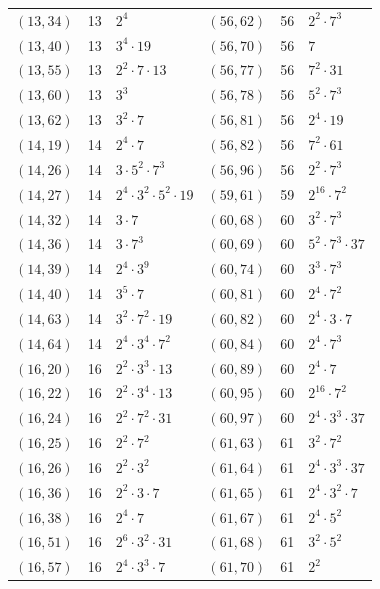 \documentclass[11pt]{article}
\begin{document}
\begin{longtable}{@{}lrl@{\qquad}lrl@{}}
$(13,34)$ & 13 & $2^{4}$ & $(56,62)$ & 56 & $2^{2}\cdot 7^{3}$\\
$(13,40)$ & 13 & $3^{4}\cdot 19$ & $(56,70)$ & 56 & $7$\\
$(13,55)$ & 13 & $2^{2}\cdot 7\cdot 13$ & $(56,77)$ & 56 & $7^{2}\cdot 31$\\
$(13,60)$ & 13 & $3^{3}$ & $(56,78)$ & 56 & $5^{2}\cdot 7^{3}$\\
$(13,62)$ & 13 & $3^{2}\cdot 7$ & $(56,81)$ & 56 & $2^{4}\cdot 19$\\
$(14,19)$ & 14 & $2^{4}\cdot 7$ & $(56,82)$ & 56 & $7^{2}\cdot 61$\\
$(14,26)$ & 14 & $3\cdot 5^{2}\cdot 7^{3}$ & $(56,96)$ & 56 & $2^{2}\cdot 7^{3}$\\
$(14,27)$ & 14 & $2^{4}\cdot 3^{2}\cdot 5^{2}\cdot 19$ & $(59,61)$ & 59 & $2^{16}\cdot 7^{2}$\\
$(14,32)$ & 14 & $3\cdot 7$ & $(60,68)$ & 60 & $3^{2}\cdot 7^{3}$\\
$(14,36)$ & 14 & $3\cdot 7^{3}$ & $(60,69)$ & 60 & $5^{2}\cdot 7^{3}\cdot 37$\\
$(14,39)$ & 14 & $2^{4}\cdot 3^{9}$ & $(60,74)$ & 60 & $3^{3}\cdot 7^{3}$\\
$(14,40)$ & 14 & $3^{5}\cdot 7$ & $(60,81)$ & 60 & $2^{4}\cdot 7^{2}$\\
$(14,63)$ & 14 & $3^{2}\cdot 7^{2}\cdot 19$ & $(60,82)$ & 60 & $2^{4}\cdot 3\cdot 7$\\
$(14,64)$ & 14 & $2^{4}\cdot 3^{4}\cdot 7^{2}$ & $(60,84)$ & 60 & $2^{4}\cdot 7^{3}$\\
$(16,20)$ & 16 & $2^{2}\cdot 3^{3}\cdot 13$ & $(60,89)$ & 60 & $2^{4}\cdot 7$\\
$(16,22)$ & 16 & $2^{2}\cdot 3^{4}\cdot 13$ & $(60,95)$ & 60 & $2^{16}\cdot 7^{2}$\\
$(16,24)$ & 16 & $2^{2}\cdot 7^{2}\cdot 31$ & $(60,97)$ & 60 & $2^{4}\cdot 3^{3}\cdot 37$\\
$(16,25)$ & 16 & $2^{2}\cdot 7^{2}$ & $(61,63)$ & 61 & $3^{2}\cdot 7^{2}$\\
$(16,26)$ & 16 & $2^{2}\cdot 3^{2}$ & $(61,64)$ & 61 & $2^{4}\cdot 3^{3}\cdot 37$\\
$(16,36)$ & 16 & $2^{2}\cdot 3\cdot 7$ & $(61,65)$ & 61 & $2^{4}\cdot 3^{2}\cdot 7$\\
$(16,38)$ & 16 & $2^{4}\cdot 7$ & $(61,67)$ & 61 & $2^{4}\cdot 5^{2}$\\
$(16,51)$ & 16 & $2^{6}\cdot 3^{2}\cdot 31$ & $(61,68)$ & 61 & $3^{2}\cdot 5^{2}$\\
$(16,57)$ & 16 & $2^{4}\cdot 3^{3}\cdot 7$ & $(61,70)$ & 61 & $2^{2}$\\

\end{longtable}
\end{document}
